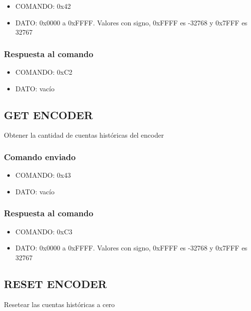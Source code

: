 \documentclass[a4paper,10pt]{article}
\begin{document}
\begin{itemize}
	\item{COMANDO:} 0x42
	\item{DATO:} 0x0000 a 0xFFFF. Valores con signo, 0xFFFF es -32768 y 0x7FFF es 32767
\end{itemize}

\subsubsection*{Respuesta al comando}

\begin{itemize}
	\item{COMANDO:} 0xC2
	\item{DATO:} vac\'io
\end{itemize}

\subsection{GET ENCODER}
\label{get_encoder}

Obtener la cantidad de cuentas hist\'oricas del encoder

\subsubsection*{Comando enviado}

\begin{itemize}
	\item{COMANDO:} 0x43
	\item{DATO:} vac\'io
\end{itemize}

\subsubsection*{Respuesta al comando}

\begin{itemize}
	\item{COMANDO:} 0xC3
	\item{DATO:} 0x0000 a 0xFFFF. Valores con signo, 0xFFFF es -32768 y 0x7FFF es 32767
\end{itemize}

\subsection{RESET ENCODER}
\label{reset_encoder}

Resetear las cuentas hist\'oricas a cero
\end{document}
